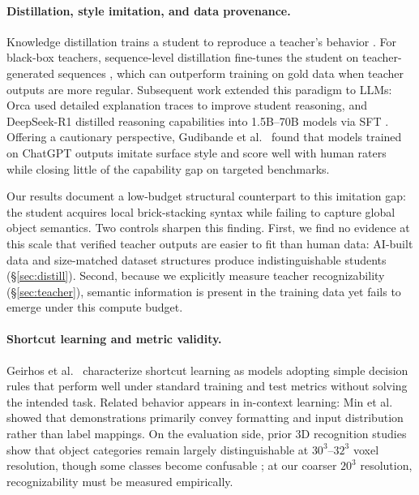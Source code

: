\documentclass{article}
\begin{document}
\paragraph{Distillation, style imitation, and data provenance.}
Knowledge distillation trains a student to reproduce a teacher's behavior \cite{hinton2015distilling}. For black-box teachers, sequence-level distillation fine-tunes the student on teacher-generated sequences \cite{kim2016sequence}, which can outperform training on gold data when teacher outputs are more regular. Subsequent work extended this paradigm to LLMs: Orca \cite{mukherjee2023orca} used detailed explanation traces to improve student reasoning, and DeepSeek-R1 distilled reasoning capabilities into 1.5B--70B models via SFT \cite{deepseekr1}. Offering a cautionary perspective, Gudibande et al.\ \cite{gudibande2023false} found that models trained on ChatGPT outputs imitate surface style and score well with human raters while closing little of the capability gap on targeted benchmarks.

Our results document a low-budget structural counterpart to this imitation gap: the student acquires local brick-stacking syntax while failing to capture global object semantics. Two controls sharpen this finding. First, we find no evidence at this scale that verified teacher outputs are easier to fit than human data: AI-built data and size-matched dataset structures produce indistinguishable students (\S\ref{sec:distill}). Second, because we explicitly measure teacher recognizability (\S\ref{sec:teacher}), semantic information is present in the training data yet fails to emerge under this compute budget.

\paragraph{Shortcut learning and metric validity.}
Geirhos et al.\ \cite{geirhos2020shortcut} characterize shortcut learning as models adopting simple decision rules that perform well under standard training and test metrics without solving the intended task. Related behavior appears in in-context learning: Min et al.\ \cite{min2022rethinking} showed that demonstrations primarily convey formatting and input distribution rather than label mappings. On the evaluation side, prior 3D recognition studies show that object categories remain largely distinguishable at $30^3$--$32^3$ voxel resolution, though some classes become confusable \cite{wu2015shapenets,maturana2015voxnet,riegler2017octnet}; at our coarser $20^3$ resolution, recognizability must be measured empirically.
\end{document}
